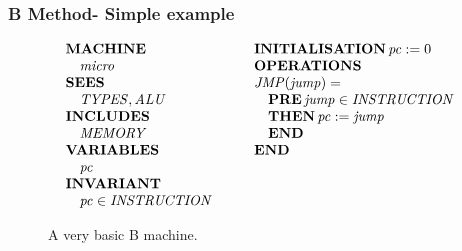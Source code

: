 \begin{frame}
\frametitle{B Method- Simple example}
\begin{figure}
  $$
  \begin{array}{lcl}
    \begin{array}[t]{l}
      \operatorname{\mathbf{MACHINE}} \\ \quad  \mathit{micro} \\
      \operatorname{\mathbf{SEES}} \\ \quad \mathit{TYPES}, \mathit{ALU} \\
      \operatorname{\mathbf{INCLUDES}} \\  \quad \mathit{MEMORY} \\
      \operatorname{\mathbf{VARIABLES}} \\ \quad    \mathit{pc}  \\
      \operatorname{\mathbf{INVARIANT}} \\ \quad \mathit{pc} \in \mathit{INSTRUCTION} 
    \end{array}
    & \hspace*{0cm} &
    \begin{array}[t]{l}
      \operatorname{\mathbf{INITIALISATION}}  \mathit{pc} := 0 \\
      \operatorname{\mathbf{OPERATIONS}}\\
      \mathit{JMP} \mathit{( jump )} = \\
      \quad \operatorname{\mathbf{PRE}} \mathit{jump} \in \mathit{INSTRUCTION}\\ 
      \quad \operatorname{\mathbf{THEN}} \mathit{pc} := \mathit{jump}\\  
      \quad \operatorname{\mathbf{END}} \\
      \operatorname{\mathbf{END}}
    \end{array}
  \end{array}
  $$
\caption{A very basic B machine.}
\label{fig:maqB}
\end{figure}
\end{frame}